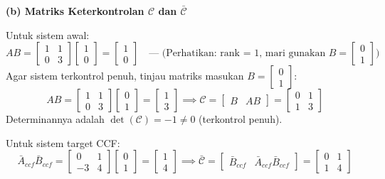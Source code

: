 \documentclass[11pt,a4paper]{article}
\begin{document}
\textbf{(b) Matriks Keterkontrolan $\mathcal{C}$ dan $\bar{\mathcal{C}}$}

Untuk sistem awal:
$$AB = \begin{bmatrix} 1 & 1 \\ 0 & 3 \end{bmatrix} \begin{bmatrix} 1 \\ 0 \end{bmatrix} = \begin{bmatrix} 1 \\ 0 \end{bmatrix} \quad \text{--- (Perhatikan: rank = 1, mari gunakan } B = \begin{bmatrix} 0 \\ 1 \end{bmatrix}\text{)}$$
Agar sistem terkontrol penuh, tinjau matriks masukan $B = \begin{bmatrix} 0 \\ 1 \end{bmatrix}$:
$$AB = \begin{bmatrix} 1 & 1 \\ 0 & 3 \end{bmatrix} \begin{bmatrix} 0 \\ 1 \end{bmatrix} = \begin{bmatrix} 1 \\ 3 \end{bmatrix} \implies \mathcal{C} = \begin{bmatrix} B & AB \end{bmatrix} = \begin{bmatrix} 0 & 1 \\ 1 & 3 \end{bmatrix}$$
Determinannya adalah $\det(\mathcal{C}) = -1 \ne 0$ (terkontrol penuh).

Untuk sistem target CCF:
$$\bar{A}_{ccf} \bar{B}_{ccf} = \begin{bmatrix} 0 & 1 \\ -3 & 4 \end{bmatrix} \begin{bmatrix} 0 \\ 1 \end{bmatrix} = \begin{bmatrix} 1 \\ 4 \end{bmatrix} \implies \bar{\mathcal{C}} = \begin{bmatrix} \bar{B}_{ccf} & \bar{A}_{ccf}\bar{B}_{ccf} \end{bmatrix} = \begin{bmatrix} 0 & 1 \\ 1 & 4 \end{bmatrix}$$
\end{document}
